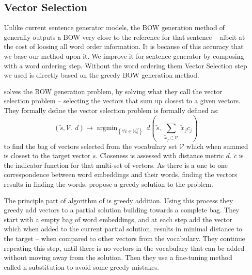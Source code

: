\documentclass[11pt]{article}
\theoremstyle{plain}
\theoremstyle{definition}
\DeclareMathOperator*{\argmin}{argmin}
\begin{document}
\subsection{Vector Selection}
\renewcommand{\c}{\tilde{c}}
\newcommand{\s}{\tilde{s}}
\newcommand{\x}{\tilde{x}}
\renewcommand{\t}{\tilde{t}}
\newcommand{\N}{\mathbb{N}}
\newcommand{\R}{\mathbb{R}}
\newcommand{\V}{\mathcal{V}}
\renewcommand{\B}{\mathcal{B}}

Unlike current sentence generator models, the BOW generation method of \textcite{White2015BOWgen} generally outputs a BOW very close to the reference for that sentence -- albeit at the cost of loosing all word order information. It is because of this accuracy that we base our method upon it. We improve it for sentence generator by composing with a word ordering step. Without the word ordering them Vector Selection step we used is directly based on the greedy BOW generation method.

\textcite{White2015BOWgen} solves the BOW generation problem, by solving what they call the vector selection problem -- selecting the vectors that sum up closest to a given vectors. They formally define the vector selection problem is formally defined as:
\[
(\s,\V,\,d) \mapsto \argmin_{\left\{ \forall\c\in\N_{0}^{V}\right\} }\:d( \s,\,\sum_{\x_j\in\V}\:\x_{j}c_{j})
\]
to find the bag of vectors selected from the vocabulary set $\V$ which when summed is closest to the target vector $\s$. Closeness is assessed with distance metric $d$. $\c$ is the indicator function for that multi-set of vectors. As there is a one to one correspondence between word embeddings and their words, finding the vectors results in finding the words. \textcite{White2015BOWgen} propose a greedy solution to the problem.
 
The principle part of algorithm of \textcite{White2015BOWgen} is greedy addition. Using this process they greedy add vectors to a partial solution building towards a complete bag. They start with a empty bag of word embeddings, and at each step add the vector which when added to the current partial solution, results in minimal distance to the target -- when compared to other vectors from the vocabulary. They continue repeating this step, until there is no vectors in the vocabulary that can be added without moving away from the solution. Then they use a fine-tuning method called n-substitution to avoid some greedy mistakes.
\end{document}
